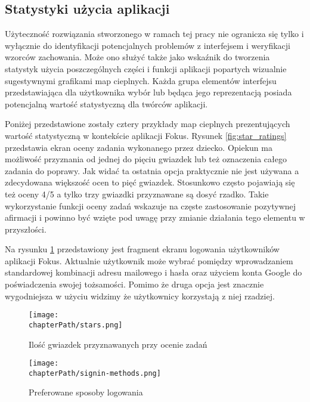 \subsection{Statystyki użycia aplikacji}
Użyteczność rozwiązania stworzonego w ramach tej pracy nie ogranicza się tylko i wyłącznie do identyfikacji potencjalnych problemów z interfejsem i weryfikacji wzorców zachowania. Może ono służyć także jako wskaźnik do tworzenia statystyk użycia poszczególnych części i funkcji aplikacji popartych wizualnie sugestywnymi grafikami map cieplnych. Każda grupa elementów interfejsu przedstawiająca dla użytkownika wybór lub będąca jego reprezentacją posiada potencjalną wartość statystyczną dla twórców aplikacji.

Poniżej przedstawione zostały cztery przykłady map cieplnych prezentujących wartość statystyczną w kontekście aplikacji Fokus. Rysunek \ref{fig:star_ratings} przedstawia ekran oceny zadania wykonanego przez dziecko. Opiekun ma możliwość przyznania od jednej do pięciu gwiazdek lub też oznaczenia całego zadania do poprawy. Jak widać ta ostatnia opcja praktycznie nie jest używana a zdecydowana większość ocen to pięć gwiazdek. Stosunkowo często pojawiają się też oceny 4/5 a tylko trzy gwiazdki przyznawane są dosyć rzadko. Takie wykorzystanie funkcji oceny zadań wskazuje na częste zastosowanie pozytywnej afirmacji i powinno być wzięte pod uwagę przy zmianie działania tego elementu w przyszłości.

Na rysunku \ref{fig:signin_methods} przedstawiony jest fragment ekranu logowania użytkowników aplikacji Fokus. Aktualnie użytkownik może wybrać pomiędzy wprowadzaniem standardowej kombinacji adresu mailowego i hasła oraz użyciem konta Google do poświadczenia swojej tożsamości. Pomimo że druga opcja jest znacznie wygodniejsza w użyciu widzimy że użytkownicy korzystają z niej rzadziej.

\bigskip
\begin{figure}[H]
\centering
\begin{minipage}{.45\textwidth}
	\centering
	\texttt{[image: \\chapterPath/stars.png]}
	\bigskip
	\caption{Ilość gwiazdek przyznawanych przy ocenie zadań}
	\label{fig:star_ratings}
\end{minipage}
\begin{minipage}{.45\textwidth}
	\centering
	\texttt{[image: \\chapterPath/signin-methods.png]}
	\bigskip
	\caption{Preferowane sposoby logowania}
	\label{fig:signin_methods}
\end{minipage}
\end{figure}


